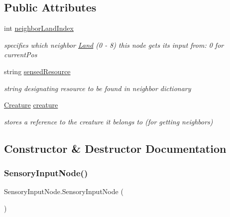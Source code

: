 \subsection*{Public Attributes}
\begin{DoxyCompactItemize}
\item 
int \mbox{\hyperlink{class_sensory_input_node_aed52405e2e63c5e5ca6ad0142b3aaede}{neighbor\+Land\+Index}}
\begin{DoxyCompactList}\small\item\em specifies which neighbor \mbox{\hyperlink{class_land}{Land}} (0 -\/ 8) this node gets it\textquotesingle{}s input from\+: 0 for current\+Pos \end{DoxyCompactList}\item 
string \mbox{\hyperlink{class_sensory_input_node_a928c67bebc7f59466c91cbc6c5552bb4}{sensed\+Resource}}
\begin{DoxyCompactList}\small\item\em string designating resource to be found in neighbor dictionary \end{DoxyCompactList}\item 
\mbox{\hyperlink{class_creature}{Creature}} \mbox{\hyperlink{class_sensory_input_node_a2886b0729565781d8e27cbfe72726625}{creature}}
\begin{DoxyCompactList}\small\item\em stores a reference to the creature it belongs to (for getting neighbors) \end{DoxyCompactList}\end{DoxyCompactItemize}


\subsection{Constructor \& Destructor Documentation}
\mbox{\label{class_sensory_input_node_a45013c0e606dabbdeb51cdb12f56108d}} 
\subsubsection{\texorpdfstring{Sensory\+Input\+Node()}{SensoryInputNode()}\hspace{0.1cm}{\footnotesize\ttfamily [1/2]}}
{\footnotesize\ttfamily Sensory\+Input\+Node.\+Sensory\+Input\+Node (\begin{DoxyParamCaption}{ }\end{DoxyParamCaption})}

